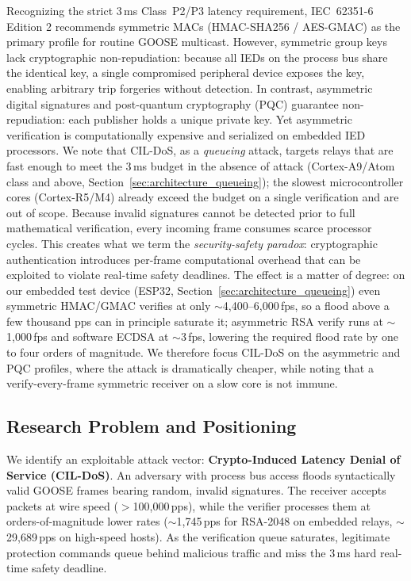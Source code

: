 \documentclass[journal]{IEEEtran}
\begin{document}
Recognizing the strict 3\,ms Class~P2/P3 latency requirement, IEC~62351-6 Edition 2 recommends symmetric MACs (HMAC-SHA256 / AES-GMAC) as the primary profile for routine GOOSE multicast. However, symmetric group keys lack cryptographic non-repudiation: because all IEDs on the process bus share the identical key, a single compromised peripheral device exposes the key, enabling arbitrary trip forgeries without detection. In contrast, asymmetric digital signatures and post-quantum cryptography (PQC) guarantee non-repudiation: each publisher holds a unique private key. Yet asymmetric verification is computationally expensive and serialized on embedded IED processors. We note that CIL-DoS, as a \emph{queueing} attack, targets relays that are fast enough to meet the 3\,ms budget in the absence of attack (Cortex-A9/Atom class and above, Section~\ref{sec:architecture_queueing}); the slowest microcontroller cores (Cortex-R5/M4) already exceed the budget on a single verification and are out of scope. Because invalid signatures cannot be detected prior to full mathematical verification, every incoming frame consumes scarce processor cycles. This creates what we term the \emph{security-safety paradox}: cryptographic authentication introduces per-frame computational overhead that can be exploited to violate real-time safety deadlines. The effect is a matter of degree: on our embedded test device (ESP32, Section~\ref{sec:architecture_queueing}) even symmetric HMAC/GMAC verifies at only $\sim$4{,}400--6{,}000\,fps, so a flood above a few thousand pps can in principle saturate it; asymmetric RSA verify runs at $\sim$1{,}000\,fps and software ECDSA at $\sim$3\,fps, lowering the required flood rate by one to four orders of magnitude. We therefore focus CIL-DoS on the asymmetric and PQC profiles, where the attack is dramatically cheaper, while noting that a verify-every-frame symmetric receiver on a slow core is not immune.

\subsection{Research Problem and Positioning}
We identify an exploitable attack vector: \textbf{Crypto-Induced Latency Denial of Service (CIL-DoS)}. An adversary with process bus access floods syntactically valid GOOSE frames bearing random, invalid signatures. The receiver accepts packets at wire speed ($>$100,000\,pps), while the verifier processes them at orders-of-magnitude lower rates ($\sim$1,745\,pps for RSA-2048 on embedded relays, $\sim$29,689\,pps on high-speed hosts). As the verification queue saturates, legitimate protection commands queue behind malicious traffic and miss the 3\,ms hard real-time safety deadline.
\end{document}
